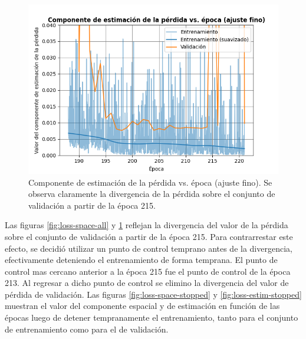 \begin{figure}[H]
    \centering
    \includegraphics[scale=0.65]{partes/img/loss-estim-all.png}
    \caption[Componente de estimación de la pérdida vs. época (ajuste fino).]{Componente de estimación de la pérdida vs. época (ajuste fino). Se observa claramente la divergencia de la pérdida sobre el conjunto de validación a partir de la época 215.}
    \label{fig:loss-estim-all}
\end{figure}

Las figuras \ref{fig:loss-space-all} y \ref{fig:loss-estim-all} reflejan la divergencia del valor de la pérdida sobre el conjunto de validación a partir de la época 215. Para contrarrestar este efecto, se decidió utilizar un punto de control temprano antes de la divergencia, efectivamente deteniendo el entrenamiento de forma temprana. El punto de control mas cercano anterior a la época 215 fue el punto de control de la época 213. Al regresar a dicho punto de control se elimino la divergencia del valor de pérdida de validación. Las figuras \ref{fig:loss-space-stopped} y \ref{fig:loss-estim-stopped} muestran el valor del componente espacial y de estimación en función de las épocas luego de detener tempranamente el entrenamiento, tanto para el conjunto de entrenamiento como para el de validación. 

